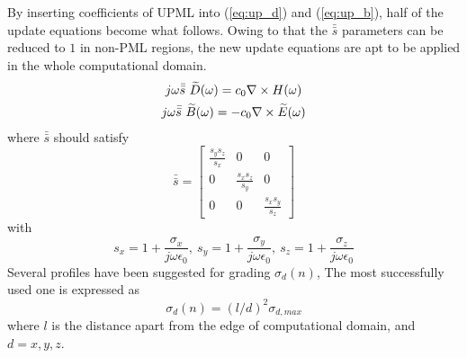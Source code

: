 By inserting coefficients of UPML into (\ref{eq:up_d}) and (\ref{eq:up_b}), half of the update equations become what
follows. Owing to that the $\bar{\bar{s}}$ parameters can be reduced to $1$ in non-PML regions, the new update equations
are apt to be applied in the whole computational domain.
\begin{gather}
  j\omega\bar{\bar{s}}\ \widetilde{D}(\omega) = c_0\nabla\times H(\omega)\\
  j\omega\bar{\bar{s}}\ \widetilde{B}(\omega) = -c_0\nabla\times \widetilde{E}(\omega)
\end{gather}
where $\bar{\bar{s}}$ should satisfy
\begin{equation}
  \bar{\bar{s}} = 
  \begin{bmatrix}
    \displaystyle\frac{s_ys_z}{s_x}& 0& 0\\
    0& \displaystyle\frac{s_xs_z}{s_y}& 0\\
    0& 0& \displaystyle\frac{s_xs_y}{s_z}
  \end{bmatrix}
\end{equation}
with 
\begin{equation}\label{eq:pmlco}
  s_x = 1 + \frac{\sigma_x}{j\omega\epsilon_0},\ 
  s_y = 1 + \frac{\sigma_y}{j\omega\epsilon_0},\ 
  s_z = 1 + \frac{\sigma_z}{j\omega\epsilon_0}
\end{equation}
Several profiles have been suggested for grading $\sigma_d(n)$, The most successfully used one is expressed as
\begin{equation}
  \sigma_d(n) = (l/d)^2\sigma_{d,max}
\end{equation}
where $l$ is the distance apart from the edge of computational domain, and $d = x,y,z$.

